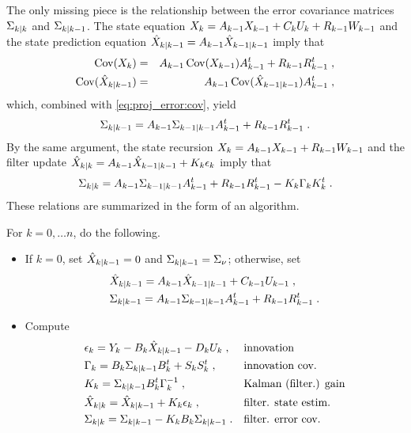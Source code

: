 The only missing piece is the relationship between the error covariance matrices
$\Sigma_{k|k}$ and $\Sigma_{k|k-1}$. The state equation $X_k = A_{k-1} X_{k-1} + C_k U_k + R_{k-1} W_{k-1}$ and the state prediction equation $\hat{X}_{k|k-1}= A_{k-1} \hat{X}_{k-1|k-1}$ imply that
\begin{eqnarray*}
\operatorname{Cov}(X_k) & = & A_{k-1} \operatorname{Cov}(X_{k-1}) A_{k-1}^t + R_{k-1} R_{k-1}^t \; ,\\
\operatorname{Cov}(\hat{X}_{k|k-1}) & = & A_{k-1} \operatorname{Cov}(\hat{X}_{k-1|k-1}) A_{k-1}^t \; ,
\end{eqnarray*}
which, combined with \eqref{eq:proj_error:cov}, yield
\begin{equation}
\label{eq:covariance-predicted-state-from-covariance-filtered-state}
\Sigma_{k|k-1} = A_{k-1} \Sigma_{k-1|k-1} A_{k-1}^t + R_{k-1} R_{k-1}^t \; .
\end{equation}
By the same argument, the state recursion $X_k = A_{k-1} X_{k-1} + R_{k-1} W_{k-1}$ and the filter update $\hat{X}_{k|k}  = A_{k-1} \hat{X}_{k-1|k-1} + K_{k} \epsilon_k$ imply that
\begin{equation}
\label{eq:riccati-filtered}
\postcov{k}{k} = \A_{k-1} \postcov{k-1}{k-1} \A_{k-1}^t + \WCov[k-1] - \KGF{k} \ICov_k \KGF{k}^t \eqsp .
\end{equation}
These relations are summarized in the form of an algorithm.

\begin{algo}
  \label{algo:filter:linear_state_space:kalman:filtered}
  For $k=0, \dots n$, do the following.
  \begin{itemize}
  \item If $k=0$, set $\hat{X}_{k|k-1} =0$ and $\Sigma_{k|k-1} =
    \Sigma_{\nu}$; otherwise, set
  \begin{align*}
    & \projx{X}{k}{k-1} = \A_{k-1} \projx{X}{k-1}{k-1} + \C_{k-1} \U_{k-1} \eqsp , \\
    & \postcov{k}{k-1} = \A_{k-1} \postcov{k-1}{k-1} \A_{k-1}^t + \WCov[k-1] \eqsp .
  \end{align*}
  \item Compute
  \begin{align}
    &\I_k  = \Y_k - \B_{k} \projx{X}{k}{k-1} - \D_k \U_k \eqsp ,&& \text{innovation} \label{eq:kalman:innovation} \\
    &\ICov_k  = \B_k \postcov{k}{k-1} \B_k^t + \VCov[k] \eqsp ,&& \text{innovation cov.}  \label{eq:kalman:innovation_cov} \\
    &\KGF{k}  =   \postcov{k}{k-1} \B_k^t \ICov_k^{-1} \eqsp , && \text{Kalman (filter.) gain}\label{eq:kalman:gain} \\
    &\postmean{k}{k} = \postmean{k}{k-1} + \KGF{k} \I_k \eqsp , && \text{filter. state estim.} \label{eq:kalman:filtered_mean} \\
    &\postcov{k}{k}  =  \postcov{k}{k-1} - \KGF{k} \B_k \postcov{k}{k-1} \eqsp . && \text{filter. error cov.} \label{eq:kalman:filtered_cov}
  \end{align}
  \end{itemize}
\end{algo}


